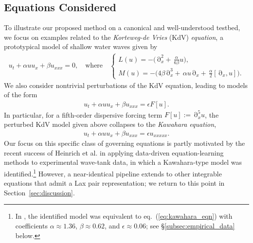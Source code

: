 \documentclass[journal=gmj]{CUP-JNL-DTM}%
\DeclareMathOperator{\pt}{\partial}
\theoremstyle{definition}
\numberwithin{equation}{section}
\begin{document}
\vspace{-2.5 mm}

\subsection{Equations Considered}\label{subsec:equations_considered}
To illustrate our proposed method on a canonical and well-understood testbed, we focus on examples related to the \textit{Korteweg-de Vries} (KdV) \textit{equation}, a prototypical model of shallow water waves given by \begin{align}\label{eq:kdv_eqn}
    u_t + \alpha uu_x + \beta u_{xxx} = 0,
    \quad \text{where} \quad
    \begin{cases}
        L(u) = -\big(\!\pt^2_{\!x} + \, \frac{\alpha}{6\beta}u\big),
        \\
        M(u) = -\big(4\beta\!\pt^3_{\!x} + \, \alpha u\!\pt_{\!x} + \, \frac{\alpha}{2}[\pt_{\!x}, u]\big).
    \end{cases}
\end{align} We also consider nontrivial perturbations of the KdV equation, leading to models of the form \begin{align}\label{eq:perturbed_kdv_eqn}
    u_t + \alpha uu_x + \beta u_{xxx} = \epsilon F[u].
\end{align} In particular, for a fifth-order dispersive forcing term $F[u] := \pt^5_{\!x} u$, the perturbed KdV model given above collapses to the \textit{Kawahara equation}, \begin{align}\label{eq:kawahara_eqn}
    u_t + \alpha uu_x + \beta u_{xxx} = \epsilon u_{xxxxx}.
\end{align} Our focus on this specific class of governing equations is partly motivated by the recent success of Heinrich et al. \cite{Heinrich.etal2025} in applying data-driven equation-learning methods to experimental wave-tank data, in which a Kawahara-type model was identified.\footnote{In \cite{Heinrich.etal2025}, the identified model was equivalent to eq.~(\ref{eq:kawahara_eqn}) with coefficients $\alpha \approx 1.36$, $\beta \approx 0.62$, and $\epsilon \approx 0.06$; see \S\ref{subsec:empirical_data} below.} However, a near-identical pipeline extends to other integrable equations that admit a Lax pair representation; we return to this point in
Section~\ref{sec:discussion}.

\newpage
\end{document}
